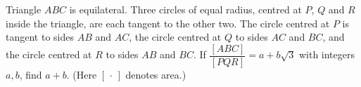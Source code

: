 Triangle $ABC$ is equilateral. Three circles of equal radius, centred at $P$, $Q$ and $R$ inside the triangle, are each tangent to the other two. The circle centred at $P$ is tangent to sides $AB$ and $AC$, the circle centred at $Q$ to sides $AC$ and $BC$, and the circle centred at $R$ to sides $AB$ and $BC$. If $\dfrac{[ABC]}{[PQR]}=a+b\sqrt3$ with integers $a,b$, find $a+b$. (Here $[\,\cdot\,]$ denotes area.)
